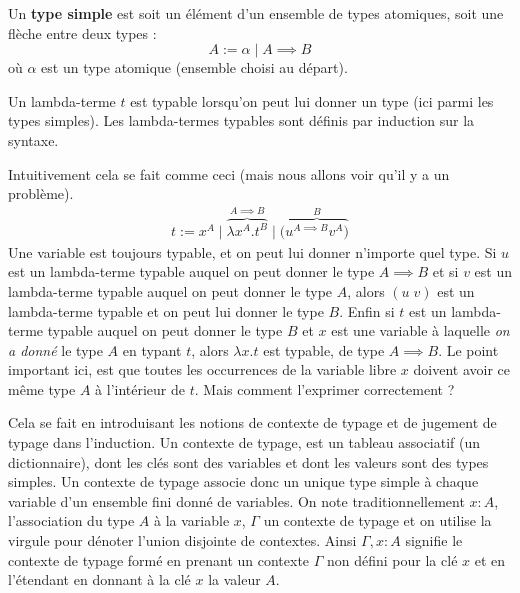 \documentclass[11pt, a4paper]{article}
\begin{document}
\begin{multicols}{2}



Un \textbf{type simple} est soit un élément d'un ensemble de types atomiques, soit une flèche entre deux types :
\[
A := \alpha \mid A\implies B
\]
où \(\alpha\) est un type atomique (ensemble choisi au départ).

Un lambda-terme \(t\) est typable lorsqu'on peut lui donner un type (ici
parmi les types simples). Les lambda-termes typables sont définis par
induction sur la syntaxe.

Intuitivement cela se fait comme ceci (mais nous allons voir qu'il y a
un problème).
\begin{gather}
t := x^A \mid \overbrace{ \lambda x^A. t^B }^{A\implies B} \mid ( \overbrace{ u^{A\implies B} v^A) }^{B}
\label{intuit}
\end{gather}
Une variable est toujours typable, et on peut lui donner
n'importe quel type. Si \(u\) est un lambda-terme typable auquel on peut
donner le type \(A\implies B\) et si \(v\) est un lambda-terme typable auquel
on peut donner le type \(A\), alors \((u\; v)\) est un lambda-terme
typable et on peut lui donner le type \(B\). Enfin si \(t\) est un
lambda-terme typable auquel on peut donner le type \(B\) et \(x\) est une
variable à laquelle \emph{on a donné} le type \(A\) en typant \(t\), alors
\(\lambda x. t\) est typable, de type \(A\implies B\). Le point important ici,
est que toutes les occurrences de la variable libre \(x\) doivent avoir
ce même type \(A\) à l'intérieur de \(t\). Mais comment l'exprimer
correctement ?

Cela se fait en introduisant les notions de contexte de typage et de
jugement de typage dans l'induction. Un contexte de typage, est un
tableau associatif (un dictionnaire), dont les clés sont des
variables et dont les valeurs sont des types simples. Un contexte de
typage associe donc un unique type simple à chaque variable d'un
ensemble fini donné de variables. On note traditionnellement \(x : A\),
l'association du type \(A\) à la variable \(x\), \(\Gamma\) un contexte de
typage et on utilise la virgule pour dénoter l'union disjointe de
contextes. Ainsi \(\Gamma, x : A\) signifie le contexte de typage formé
en prenant un contexte \(\Gamma\) non défini pour la clé \(x\) et en
l'étendant en donnant à la clé \(x\) la valeur \(A\).


\end{multicols}
\end{document}
